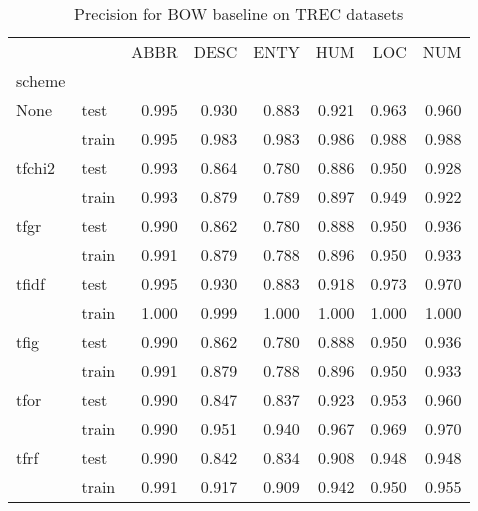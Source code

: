 \begin{table}[h]
\begin{center}

\begin{tabular}{llrrrrrr}
\toprule
{} &&  ABBR &  DESC &  ENTY &  HUM &  LOC &  NUM \\
scheme &  & & & &&&\\
\midrule
None & test & 0.995 & 0.930 & 0.883 &0.921 &0.963 &0.960 \\
{} & train & 0.995 & 0.983 & 0.983 &0.986 &0.988 &0.988 \\
tfchi2 & test & 0.993 & 0.864 & 0.780 &0.886 &0.950 &0.928 \\
{} & train & 0.993 & 0.879 & 0.789 &0.897 &0.949 &0.922 \\
tfgr & test & 0.990 & 0.862 & 0.780 &0.888 &0.950 &0.936 \\
{} & train & 0.991 & 0.879 & 0.788 &0.896 &0.950 &0.933 \\
tfidf & test & 0.995 & 0.930 & 0.883 &0.918 &0.973 &0.970 \\
{} & train & 1.000 & 0.999 & 1.000 &1.000 &1.000 &1.000 \\
tfig & test & 0.990 & 0.862 & 0.780 &0.888 &0.950 &0.936 \\
{} & train & 0.991 & 0.879 & 0.788 &0.896 &0.950 &0.933 \\
tfor & test & 0.990 & 0.847 & 0.837 &0.923 &0.953 &0.960 \\
{} & train & 0.990 & 0.951 & 0.940 &0.967 &0.969 &0.970 \\
tfrf & test & 0.990 & 0.842 & 0.834 &0.908 &0.948 &0.948 \\
{} & train & 0.991 & 0.917 & 0.909 &0.942 &0.950 &0.955 \\
\bottomrule
\end{tabular}

\caption[Precision for BOW baseline on TREC datasets]{Precision for BOW baseline on TREC datasets}
\label{tab:}
\end{center}
\end{table}

